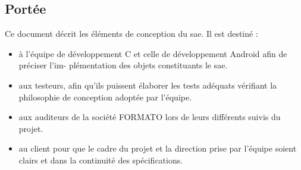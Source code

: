 \subsection{Portée} %

Ce document décrit les éléments de conception du \gls{sae}. Il est destiné :
\begin{itemize}
    \item à l’équipe de développement C et celle de développement Android afin de préciser l’im-
    plémentation des objets constituants le \gls{sae}.
    \item aux testeurs, afin qu’ils puissent élaborer les tests adéquats vérifiant la philosophie de
    conception adoptée par l’équipe.
    \item aux auditeurs de la société FORMATO lors de leurs différents suivis du projet.
    \item au client pour que le cadre du projet et la direction prise par l’équipe soient clairs et dans la continuité des spécifications.
\end{itemize}